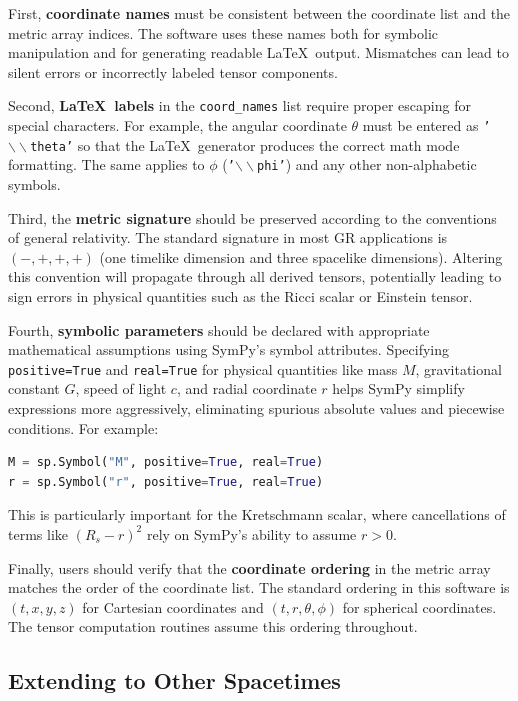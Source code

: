 \documentclass[11pt,a4paper]{article}
\begin{document}
First, \textbf{coordinate names} must be consistent between the coordinate list and the metric array indices. The software uses these names both for symbolic manipulation and for generating readable \LaTeX\ output. Mismatches can lead to silent errors or incorrectly labeled tensor components.

Second, \textbf{\LaTeX\ labels} in the \texttt{coord\_names} list require proper escaping for special characters. For example, the angular coordinate $\theta$ must be entered as \texttt{'$\backslash\backslash$theta'} so that the \LaTeX\ generator produces the correct math mode formatting. The same applies to $\phi$ (\texttt{'$\backslash\backslash$phi'}) and any other non-alphabetic symbols.

Third, the \textbf{metric signature} should be preserved according to the conventions of general relativity. The standard signature in most GR applications is $(-,+,+,+)$ (one timelike dimension and three spacelike dimensions). Altering this convention will propagate through all derived tensors, potentially leading to sign errors in physical quantities such as the Ricci scalar or Einstein tensor.

Fourth, \textbf{symbolic parameters} should be declared with appropriate mathematical assumptions using SymPy's symbol attributes. Specifying \texttt{positive=True} and \texttt{real=True} for physical quantities like mass $M$, gravitational constant $G$, speed of light $c$, and radial coordinate $r$ helps SymPy simplify expressions more aggressively, eliminating spurious absolute values and piecewise conditions. For example:
\begin{lstlisting}[language=Python]
M = sp.Symbol("M", positive=True, real=True)
r = sp.Symbol("r", positive=True, real=True)
\end{lstlisting}
This is particularly important for the Kretschmann scalar, where cancellations of terms like $(R_s - r)^2$ rely on SymPy's ability to assume $r > 0$.

Finally, users should verify that the \textbf{coordinate ordering} in the metric array matches the order of the coordinate list. The standard ordering in this software is $(t, x, y, z)$ for Cartesian coordinates and $(t, r, \theta, \phi)$ for spherical coordinates. The tensor computation routines assume this ordering throughout.

\subsection{Extending to Other Spacetimes}
\end{document}
